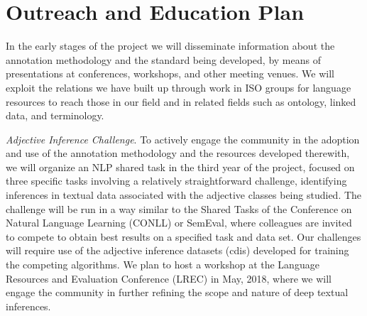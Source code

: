 \documentclass[10pt]{article}
\begin{document}
\vspace {-4mm}
\section{Outreach and Education Plan}

\vspace {-3mm}



In the early stages of the project we will disseminate information about the annotation methodology and the standard being developed, by means of presentations at conferences, workshops, and other meeting venues. We will  exploit the relations we have built up through work in ISO groups for language resources to reach 
those in our field and
in related fields such as ontology, linked data, and terminology.  


{\it Adjective Inference Challenge}. To actively engage the community in the adoption and  use of the annotation methodology and the resources developed therewith, we will organize an  NLP shared task in the third year of the project,  focused on three specific tasks involving a relatively straightforward challenge,  identifying inferences in textual data associated with the adjective classes being studied. 
The challenge will be run in a way similar to the Shared Tasks of the Conference on Natural Language Learning (CONLL) or SemEval, where colleagues are invited to compete to obtain best results on a specified task and data set. Our challenges will require use of the adjective inference datasets ({\sc cdi}s) developed for training the competing algorithms.  We plan to host a workshop at the Language Resources and Evaluation Conference (LREC) in May, 2018, where we will engage the community in further refining the scope and nature of deep textual inferences.
\end{document}
